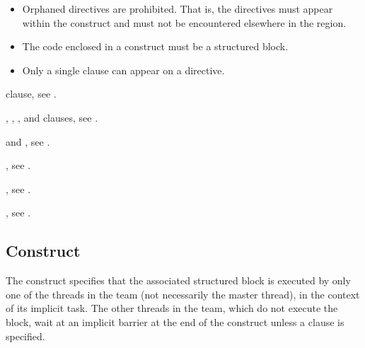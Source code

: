 \begin{itemize}
\item Orphaned  directives are prohibited. That is, the 
       directives must appear within the  
      construct and must not be encountered elsewhere in the  region.
\item The code enclosed in a  construct must be a structured block.
\item Only a single  clause can appear on a  directive.

\end{itemize}

\begin{crossrefs}
\item {} clause, see
.

\item {}, , , and 
 clauses, see .

\item {} and , see
  .

\item {}, see .

\item {}, see
.

\item {}, see 
.

\end{crossrefs}



\subsection{ Construct}
\label{subsec:single Construct}
\summary
The  construct specifies that the associated structured block is 
executed by only one of the threads in the team (not necessarily the master 
thread), in the context of its implicit task. The other threads in the team, 
which do not execute the block, wait at an implicit barrier at the end of the 
 construct unless a  clause is specified.

